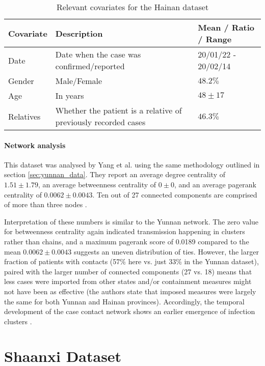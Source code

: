 \begin{table}
	\begin{tabularx}{\linewidth}{XXX}
		\hline
		\textbf{Covariate} & \textbf{Description} & \textbf{Mean / Ratio / Range}\\
		\hline
		Date & Date when the case was confirmed/reported & 20/01/22 - 20/02/14\\
		Gender & Male/Female & $48.2\%$ \\
		Age & In years & $48\pm17$ \\
		Relatives & Whether the patient is a relative of previously recorded cases & $46.3\%$ \\
		\hline
	\end{tabularx}
	\caption{Relevant covariates for the Hainan dataset}
	\label{tab:hainan_covariates}
\end{table}

\paragraph{Network analysis} This dataset was analysed by Yang et al. using the same methodology outlined in section \ref{sec:yunnan_data}. They report an average degree centrality of $1.51\pm1.79$, an average betweenness centrality of $0\pm0$, and an average pagerank centrality of $0.0062\pm0.0043$. Ten out of 27 connected components are comprised of more than three nodes \cite{hainan_publication}. 

Interpretation of these numbers is similar to the Yunnan network. The zero value for betweenness centrality again indicated transmission happening in clusters rather than chains, and a maximum pagerank score of 0.0189 compared to the mean $0.0062\pm0.0043$ suggests an uneven distribution of ties. However, the larger fraction of patients with contacts (57\% here vs. just 33\% in the Yunnan dataset), paired with the larger number of connected components (27 vs. 18) means that less cases were imported from other states and/or containment measures might not have been as effective (the authors state that imposed measures were largely the same for both Yunnan and Hainan provinces). Accordingly, the temporal development of the case contact network shows an earlier emergence of infection clusters \cite{hainan_publication}.

\section{Shaanxi Dataset}
\label{sec:shaanxi_data}

